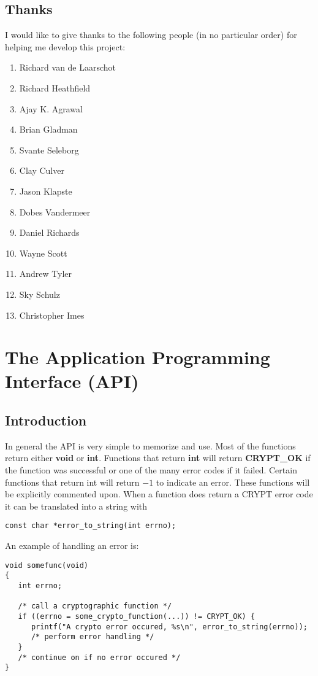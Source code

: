 \documentclass{book}
\begin{document}
\section{Thanks}
I would like to give thanks to the following people (in no particular order) for helping me develop this project:
\begin{enumerate}
   \item Richard van de Laarschot
   \item Richard Heathfield
   \item Ajay K. Agrawal
   \item Brian Gladman
   \item Svante Seleborg
   \item Clay Culver
   \item Jason Klapste
   \item Dobes Vandermeer
   \item Daniel Richards
   \item Wayne Scott
   \item Andrew Tyler
   \item Sky Schulz
   \item Christopher Imes
\end{enumerate}

\chapter{The Application Programming Interface (API)}
\section{Introduction}
 

In general the API is very simple to memorize and use.  Most of the functions return either {\bf void} or {\bf int}.  Functions
that return {\bf int} will return {\bf CRYPT\_OK} if the function was successful or one of the many error codes 
if it failed.  Certain functions that return int will return $-1$ to indicate an error.  These functions will be explicitly
commented upon.  When a function does return a CRYPT error code it can be translated into a string with

\begin{verbatim}
const char *error_to_string(int errno);
\end{verbatim}

An example of handling an error is:
\begin{verbatim}
void somefunc(void)
{
   int errno;
   
   /* call a cryptographic function */
   if ((errno = some_crypto_function(...)) != CRYPT_OK) {
      printf("A crypto error occured, %s\n", error_to_string(errno));
      /* perform error handling */
   }
   /* continue on if no error occured */
}
\end{verbatim}
\end{document}
